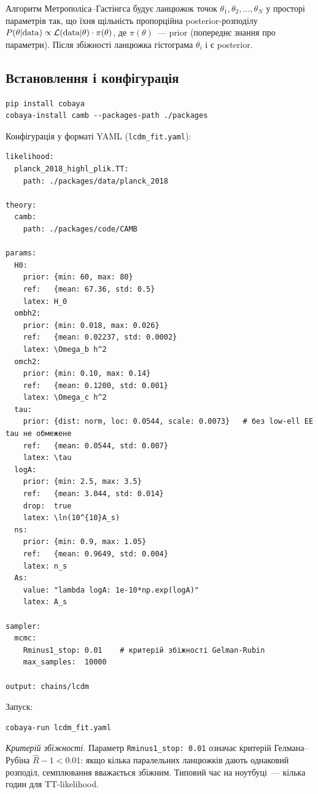Алгоритм Метрополіса--Гастінгса будує ланцюжок точок
$\theta_1, \theta_2, \ldots, \theta_N$ у просторі параметрів
так, що їхня щільність пропорційна posterior-розподілу
$P(\theta | {\rm data}) \propto \mathcal{L}({\rm data}|\theta)
\cdot \pi(\theta)$, де $\pi(\theta)$~--- prior (попереднє
знання про параметри). Після збіжності ланцюжка гістограма
$\theta_i$ і є posterior.

\subsection{Встановлення і конфігурація}

\begin{verbatim}
pip install cobaya
cobaya-install camb --packages-path ./packages
\end{verbatim}

Конфігурація у форматі YAML (\texttt{lcdm\_fit.yaml}):

\begin{verbatim}
likelihood:
  planck_2018_highl_plik.TT:
    path: ./packages/data/planck_2018

theory:
  camb:
    path: ./packages/code/CAMB

params:
  H0:
    prior: {min: 60, max: 80}
    ref:   {mean: 67.36, std: 0.5}
    latex: H_0
  ombh2:
    prior: {min: 0.018, max: 0.026}
    ref:   {mean: 0.02237, std: 0.0002}
    latex: \Omega_b h^2
  omch2:
    prior: {min: 0.10, max: 0.14}
    ref:   {mean: 0.1200, std: 0.001}
    latex: \Omega_c h^2
  tau:
    prior: {dist: norm, loc: 0.0544, scale: 0.0073}   # без low-ell EE tau не обмежене
    ref:   {mean: 0.0544, std: 0.007}
    latex: \tau
  logA:
    prior: {min: 2.5, max: 3.5}
    ref:   {mean: 3.044, std: 0.014}
    drop:  true
    latex: \ln(10^{10}A_s)
  ns:
    prior: {min: 0.9, max: 1.05}
    ref:   {mean: 0.9649, std: 0.004}
    latex: n_s
  As:
    value: "lambda logA: 1e-10*np.exp(logA)"
    latex: A_s

sampler:
  mcmc:
    Rminus1_stop: 0.01    # критерій збіжності Gelman-Rubin
    max_samples:  10000

output: chains/lcdm
\end{verbatim}

Запуск:
\begin{verbatim}
cobaya-run lcdm_fit.yaml
\end{verbatim}

\noindent
\textit{Критерій збіжності.} Параметр \texttt{Rminus1\_stop: 0.01}
означає критерій Гелмана--Рубіна $\hat{R} - 1 < 0.01$: якщо
кілька паралельних ланцюжків дають однаковий розподіл,
семплювання вважається збіжним. Типовий час на ноутбуці~---
кілька годин для TT-likelihood.

